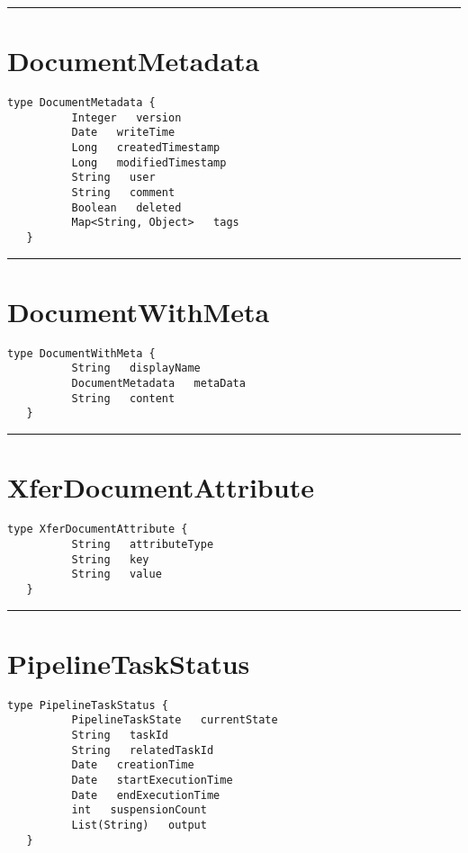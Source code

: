 \rule{12cm}{2pt}
\section{DocumentMetadata}
\label{type:DocumentMetadata}

\begin{lstlisting}[style=nonumbers]
   type DocumentMetadata {
          Integer   version
          Date   writeTime
          Long   createdTimestamp
          Long   modifiedTimestamp
          String   user
          String   comment
          Boolean   deleted
          Map<String, Object>   tags
   }
\end{lstlisting}

\rule{12cm}{2pt}
\section{DocumentWithMeta}
\label{type:DocumentWithMeta}

\begin{lstlisting}[style=nonumbers]
   type DocumentWithMeta {
          String   displayName
          DocumentMetadata   metaData
          String   content
   }
\end{lstlisting}

\rule{12cm}{2pt}
\section{XferDocumentAttribute}
\label{type:XferDocumentAttribute}

\begin{lstlisting}[style=nonumbers]
   type XferDocumentAttribute {
          String   attributeType
          String   key
          String   value
   }
\end{lstlisting}

\rule{12cm}{2pt}
\section{PipelineTaskStatus}
\label{type:PipelineTaskStatus}

\begin{lstlisting}[style=nonumbers]
   type PipelineTaskStatus {
          PipelineTaskState   currentState
          String   taskId
          String   relatedTaskId
          Date   creationTime
          Date   startExecutionTime
          Date   endExecutionTime
          int   suspensionCount
          List(String)   output
   }
\end{lstlisting}

